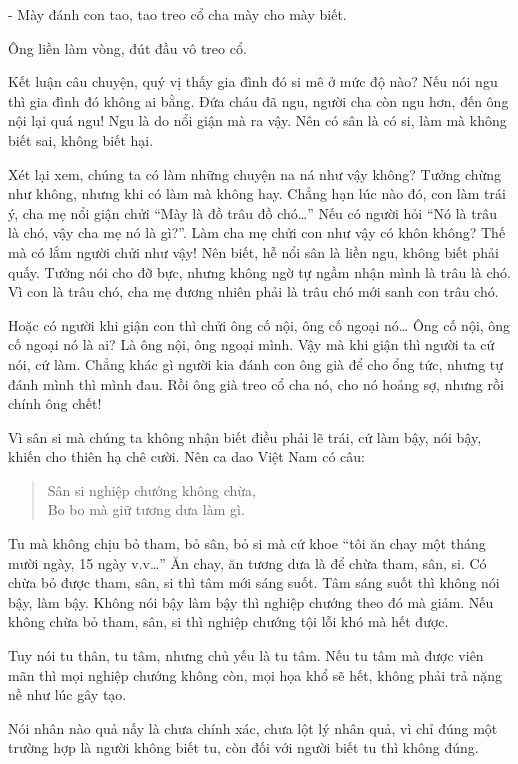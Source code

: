 \documentclass[
  12pt,
  oneside]{book}
\begin{document}
- Mày đánh con tao, tao treo cổ cha mày cho mày biết.

Ông liền làm vòng, đút đầu vô treo cổ.

Kết luận câu chuyện, quý vị thấy gia đình đó si mê ở mức độ nào? Nếu nói ngu thì gia đình đó không ai bằng. Đứa cháu đã ngu, người cha còn ngu hơn, đến ông nội lại quá ngu! Ngu là do nổi giận mà ra vậy. Nên có sân là có si, làm mà không biết sai, không biết hại.

Xét lại xem, chúng ta có làm những chuyện na ná như vậy không? Tưởng chừng như không, nhưng khi có làm mà không hay. Chẳng hạn lúc nào đó, con làm trái ý, cha mẹ nổi giận chửi ``Mày là đồ trâu đồ chó\ldots{}'' Nếu có người hỏi ``Nó là trâu là chó, vậy cha mẹ nó là gì?''. Làm cha mẹ chửi con như vậy có khôn không? Thế mà có lắm người chửi như vậy! Nên biết, hễ nổi sân là liền ngu, không biết phải quấy. Tưởng nói cho đỡ bực, nhưng không ngờ tự ngầm nhận mình là trâu là chó. Vì con là trâu chó, cha mẹ đương nhiên phải là trâu chó mới sanh con trâu chó.

Hoặc có người khi giận con thì chửi ông cố nội, ông cố ngoại nó\ldots{} Ông cố nội, ông cố ngoại nó là ai? Là ông nội, ông ngoại mình. Vậy mà khi giận thì người ta cứ nói, cứ làm. Chẳng khác gì người kia đánh con ông già để cho ổng tức, nhưng tự đánh mình thì mình đau. Rồi ông già treo cổ cha nó, cho nó hoảng sợ, nhưng rồi chính ông chết!

Vì sân si mà chúng ta không nhận biết điều phải lẽ trái, cứ làm bậy, nói bậy, khiến cho thiên hạ chê cười. Nên ca dao Việt Nam có câu:

\begin{quote}
Sân si nghiệp chướng không chừa,\\
Bo bo mà giữ tương dưa làm gì.
\end{quote}

Tu mà không chịu bỏ tham, bỏ sân, bỏ si mà cứ khoe ``tôi ăn chay một tháng mười ngày, 15 ngày v.v\ldots{}'' Ăn chay, ăn tương dưa là để chừa tham, sân, si. Có chừa bỏ được tham, sân, si thì tâm mới sáng suốt. Tâm sáng suốt thì không nói bậy, làm bậy. Không nói bậy làm bậy thì nghiệp chướng theo đó mà giảm. Nếu không chừa bỏ tham, sân, si thì nghiệp chướng tội lỗi khó mà hết được.

Tuy nói tu thân, tu tâm, nhưng chủ yếu là tu tâm. Nếu tu tâm mà được viên mãn thì mọi nghiệp chướng không còn, mọi họa khổ sẽ hết, không phải trả nặng nề như lúc gây tạo.

Nói nhân nào quả nấy là chưa chính xác, chưa lột lý nhân quả, vì chỉ đúng một trường hợp là người không biết tu, còn đối với người biết tu thì không đúng.
\end{document}
